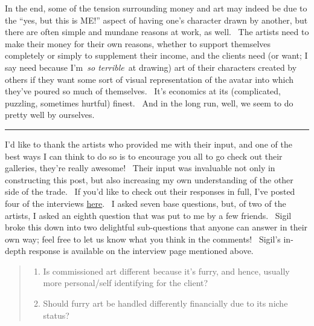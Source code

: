 In the end, some of the tension surrounding money and art may indeed be
due to the ``yes, but this is ME!'' aspect of having one's character
drawn by another, but there are often simple and mundane reasons at
work, as well. ~The artists need to make their money for their own
reasons, whether to support themselves completely or simply to
supplement their income, and the clients need (or want; I say need
because I'm~\emph{so terrible}~at drawing) art of their characters
created by others if they want some sort of visual representation of the
avatar into which they've poured so much of themselves. ~It's economics
at its (complicated, puzzling, sometimes hurtful) finest. ~And in the
long run, well, we seem to do pretty well by ourselves.

\begin{center}\rule{0.5\linewidth}{\linethickness}\end{center}

I'd like to thank the artists who provided me with their input, and one
of the best ways I can think to do so is to encourage you all to go
check out their galleries, they're really awesome! ~Their input was
invaluable not only in constructing this post, but also increasing my
own understanding of the other side of the trade. ~If you'd like to
check out their responses in full, I've posted four of the interviews
\href{http://adjectivespecies.com/interviews-for-art-and-money/}{here}.
~I asked seven base questions, but, of two of the artists, I asked an
eighth question that was put to me by a few friends. ~Sigil broke this
down into two delightful sub-questions that anyone can answer in their
own way; feel free to let us know what you think in the comments!
~Sigil's in-depth response is available on the interview page mentioned
above.

\begin{quote}
\begin{enumerate}
\def\labelenumi{\arabic{enumi}.}
\item
  Is commissioned art different because it's furry, and hence, usually
  more personal/self identifying for the client?
\item
  Should furry art be handled differently financially due to its niche
  status?
\end{enumerate}
\end{quote}
